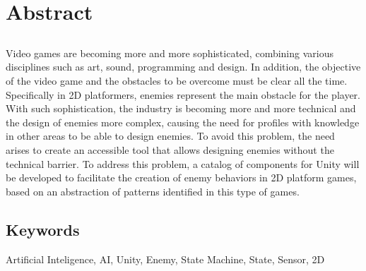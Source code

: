 \chapter*{Abstract}

\section*{\tituloPortadaEngVal}
Video games are becoming more and more sophisticated, combining various disciplines such as art, sound, programming and design. In addition, the objective of the video game and the obstacles to be overcome must be clear all the time. Specifically in 2D platformers, enemies represent the main obstacle for the player. With such sophistication, the industry is becoming more and more technical and the design of enemies more complex, causing the need for profiles with knowledge in other areas to be able to design enemies. To avoid this problem, the need arises to create an accessible tool that allows designing enemies without the technical barrier. To address this problem, a catalog of components for Unity will be developed to facilitate the creation of enemy behaviors in 2D platform games, based on an abstraction of patterns identified in this type of games.
\section*{Keywords}

\noindent  Artificial Inteligence, AI, Unity, Enemy, State Machine, State, Sensor, 2D




